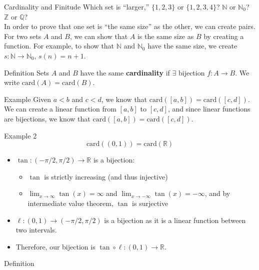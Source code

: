 \documentclass[8pt]{extarticle}
\begin{document}
  \begin{problem}{Cardinality and Finitude}
    Which set is ``larger,'' $\{1,2,3\}$ or $\{1,2,3,4\}$? $\mathbb{N}$ or $\mathbb{N}_0$? $\mathbb{Z}$ or $\mathbb{Q}$?\\

    In order to prove that one set is ``the same size'' as the other, we can create pairs. For two sets $A$ and $B$, we can show that $A$ is the same size as $B$ by creating a function. For example, to show that $\mathbb{N}$ and $\mathbb{N}_0$ have the same size, we create $s:\mathbb{N} \rightarrow \mathbb{N}_0$, $s(n) = n+1$.

    \begin{problem}{Definition}
      Sets $A$ and $B$ have the same \textbf{cardinality} if $\exists$ bijection $f:A\rightarrow B$. We write $\textrm{card}(A) = \textrm{card}(B)$.
    \end{problem}
    \begin{problem}{Example}
      Given $a<b$ and $c<d$, we know that $\textrm{card}\left([a,b]\right) = \textrm{card}\left([c,d]\right)$.
      \tcblower
      We can create a linear function from $[a,b]$ to $[c,d]$, and since linear functions are bijections, we know that $\textrm{card}\left([a,b]\right) = \textrm{card}\left([c,d]\right)$.
    \end{problem}
    \begin{problem}{Example 2}
      \[
        \textrm{card}\left((0,1)\right) = \textrm{card}(\mathbb{R})
      \] 
      \tcblower
      \begin{itemize}
        \item $\tan: (-\pi/2,\pi/2) \rightarrow \mathbb{R}$ is a bijection:
          \begin{itemize}
            \item $\tan$ is strictly increasing (and thus injective)
            \item $\lim_{x\rightarrow\infty} \tan(x) = \infty$ and $\lim_{x\rightarrow -\infty}\tan(x) = -\infty$, and by intermediate value theorem, $\tan$ is surjective
          \end{itemize}
        \item $\ell: (0,1) \rightarrow (-\pi/2,\pi/2)$ is a bijection as it is a linear function between two intervals.
        \item Therefore, our bijection is $\tan \circ \ell: (0,1) \rightarrow \mathbb{R}$.
      \end{itemize}
    \end{problem}
    \begin{problem}{Definition}

\end{problem}
\end{problem}
\end{document}
